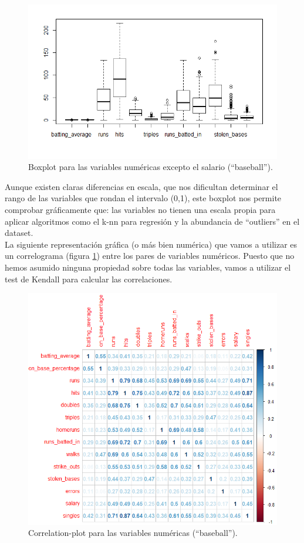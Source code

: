 \documentclass[a4paper,12pt, oneside]{book}
\begin{document}
\begin{figure}[H]
\centering
\includegraphics[scale=0.6]{images/boxplot.png}
\caption{Boxplot para las variables numéricas excepto el salario (``baseball'').}
\end{figure}


Aunque existen claras diferencias en escala, que nos dificultan determinar el rango de las variables que rondan el intervalo (0,1), este boxplot nos permite comprobar gráficamente que: las variables no tienen una escala propia para aplicar algoritmos como el k-nn para regresión y la abundancia de ``outliers'' en el dataset. \\


La siguiente representación gráfica (o más bien numérica) que vamos a utilizar es un correlograma (figura \ref{correplotbaseball}) entre los pares de variables numéricos. Puesto que no hemos asumido ninguna propiedad sobre todas las variables, vamos a utilizar el test de Kendall para calcular las correlaciones.\\

\begin{figure}[H]
\centering
\includegraphics[scale=0.5]{images/corrplot_baseball.png}
\caption{Correlation-plot para las variables numéricas (``baseball'').}
\label{correplotbaseball}
\end{figure}
\end{document}
